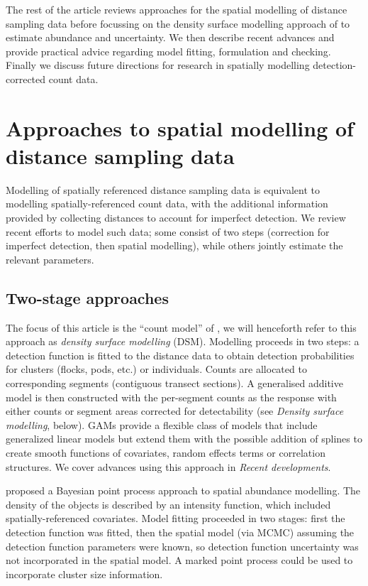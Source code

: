 \documentclass[a4paper,12pt]{article}
\begin{document}
The rest of the article reviews approaches for the spatial modelling of distance sampling data before focussing on the density surface modelling approach of \cite{Hedley:2004et} to estimate abundance and uncertainty. We then describe recent advances and provide practical advice regarding model fitting, formulation and checking. Finally we discuss future directions for research in spatially modelling detection-corrected count data.


\section*{Approaches to spatial modelling of distance sampling data}
\label{s:approaches}

Modelling of spatially referenced distance sampling data is equivalent to modelling spatially-referenced count data, with the additional information provided by collecting distances to account for imperfect detection. We review recent efforts to model such data; some consist of two steps (correction for imperfect detection, then spatial modelling), while others jointly estimate the relevant parameters.

\subsection*{Two-stage approaches}

The focus of this article is the ``count model'' of \cite{Hedley:2004et}, we will henceforth refer to this approach as \textit{density surface modelling} (DSM). Modelling proceeds in two steps: a detection function is fitted to the distance data to obtain detection probabilities for clusters (flocks, pods, etc.) or individuals. Counts are allocated to corresponding segments (contiguous transect sections). A generalised additive model \cite[GAM; e.g.][]{Wood:2006wz} is then constructed with the per-segment counts as the response with either counts or segment areas corrected for detectability (see \textit{Density surface modelling}, below). GAMs provide a flexible class of models that include generalized linear models \citep[GLMs;][]{McCullagh:1989ux} but extend them with the possible addition of splines to create smooth functions of covariates, random effects terms or correlation structures. We cover advances using this approach in \textit{Recent developments}.

\cite{Niemi:2010kx} proposed a Bayesian point process approach to spatial abundance modelling. The density of the objects is described by an intensity function, which included spatially-referenced covariates. Model fitting proceeded in two stages: first the detection function was fitted, then the spatial model (via MCMC) assuming the detection function parameters were known, so detection function uncertainty was not incorporated in the spatial model. A marked point process \citep[Section 5.5]{cox1980point} could be used to incorporate cluster size information.
\end{document}
